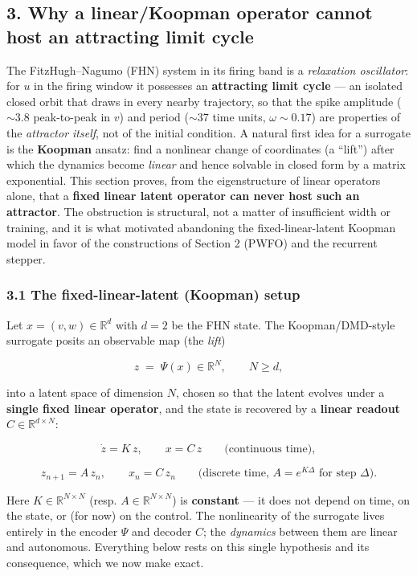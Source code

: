 \documentclass[
  11pt,
]{article}
\begin{document}
\subsection{3. Why a linear/Koopman operator cannot host an attracting
limit
cycle}\label{why-a-linearkoopman-operator-cannot-host-an-attracting-limit-cycle}

The FitzHugh--Nagumo (FHN) system in its firing band is a
\emph{relaxation oscillator}: for \(u\) in the firing window it
possesses an \textbf{attracting limit cycle} --- an isolated closed
orbit that draws in every nearby trajectory, so that the spike amplitude
(\(\sim 3.8\) peak-to-peak in \(v\)) and period (\(\sim 37\) time units,
\(\omega \sim 0.17\)) are properties of the \emph{attractor itself}, not
of the initial condition. A natural first idea for a surrogate is the
\textbf{Koopman} ansatz: find a nonlinear change of coordinates (a
``lift'') after which the dynamics become \emph{linear} and hence
solvable in closed form by a matrix exponential. This section proves,
from the eigenstructure of linear operators alone, that a \textbf{fixed
linear latent operator can never host such an attractor}. The
obstruction is structural, not a matter of insufficient width or
training, and it is what motivated abandoning the fixed-linear-latent
Koopman model in favor of the constructions of Section 2 (PWFO) and the
recurrent stepper.

\subsubsection{3.1 The fixed-linear-latent (Koopman)
setup}\label{the-fixed-linear-latent-koopman-setup}

Let \(x = (v,w) \in \mathbb{R}^{d}\) with \(d=2\) be the FHN state. The
Koopman/DMD-style surrogate posits an observable map (the \emph{lift})

\[
z \;=\; \Psi(x)\in\mathbb{R}^{N},\qquad N \ge d,
\]

into a latent space of dimension \(N\), chosen so that the latent
evolves under a \textbf{single fixed linear operator}, and the state is
recovered by a \textbf{linear readout} \(C\in\mathbb{R}^{d\times N}\):

\[
\dot z = K\,z,\qquad x = C\,z
\qquad\text{(continuous time)},
\tag{3.1}
\]

\[
z_{n+1} = A\,z_n,\qquad x_n = C\,z_n
\qquad\text{(discrete time, }A=e^{K\Delta}\text{ for step }\Delta).
\tag{3.2}
\]

Here \(K\in\mathbb{R}^{N\times N}\) (resp.
\(A\in\mathbb{R}^{N\times N}\)) is \textbf{constant} --- it does not
depend on time, on the state, or (for now) on the control. The
nonlinearity of the surrogate lives entirely in the encoder \(\Psi\) and
decoder \(C\); the \emph{dynamics} between them are linear and
autonomous. Everything below rests on this single hypothesis and its
consequence, which we now make exact.
\end{document}
